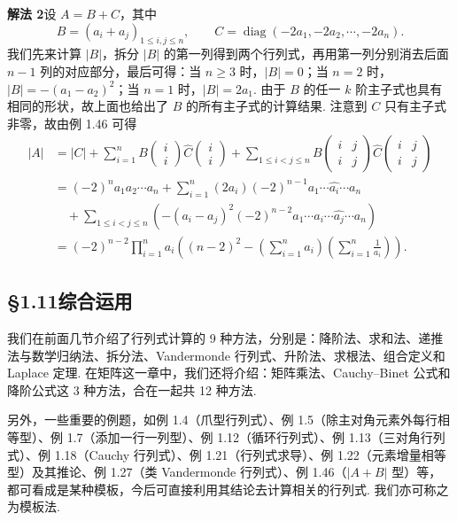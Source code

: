 \documentclass[UTF8,12pt,a4paper,fontset=fandol]{ctexart}
\begin{document}
\noindent\textbf{解法 2}\quad 设 $A=B+C$，其中
\[
B=(a_i+a_j)_{1\le i,j\le n},\qquad C=\operatorname{diag}(-2a_1,-2a_2,\cdots,-2a_n).
\]
我们先来计算 $|B|$，拆分 $|B|$ 的第一列得到两个行列式，再用第一列分别消去后面 $n-1$ 列的对应部分，最后可得：当 $n\ge3$ 时，$|B|=0$；当 $n=2$ 时，$|B|=-(a_1-a_2)^2$；当 $n=1$ 时，$|B|=2a_1$. 由于 $B$ 的任一 $k$ 阶主子式也具有相同的形状，故上面也给出了 $B$ 的所有主子式的计算结果. 注意到 $C$ 只有主子式非零，故由例 1.46 可得
\[
\begin{aligned}
|A|
&=|C|+\sum_{i=1}^n B\begin{pmatrix}i\\ i\end{pmatrix}\widehat{C}\begin{pmatrix}i\\ i\end{pmatrix}
+\sum_{1\le i<j\le n}B\begin{pmatrix}i&j\\ i&j\end{pmatrix}\widehat{C}\begin{pmatrix}i&j\\ i&j\end{pmatrix}\\
&=(-2)^na_1a_2\cdots a_n+\sum_{i=1}^n(2a_i)(-2)^{n-1}a_1\cdots\widehat{a_i}\cdots a_n\\
&\quad+\sum_{1\le i<j\le n}\left(-(a_i-a_j)^2(-2)^{n-2}a_1\cdots\widehat{a_i}\cdots\widehat{a_j}\cdots a_n\right)\\
&=(-2)^{n-2}\prod_{i=1}^n a_i
\left((n-2)^2-\left(\sum_{i=1}^n a_i\right)\left(\sum_{i=1}^n\frac1{a_i}\right)\right).
\end{aligned}
\]

\subsection*{§1.11\quad 综合运用}

我们在前面几节介绍了行列式计算的 9 种方法，分别是：降阶法、求和法、递推法与数学归纳法、拆分法、Vandermonde 行列式、升阶法、求根法、组合定义和 Laplace 定理. 在矩阵这一章中，我们还将介绍：矩阵乘法、Cauchy--Binet 公式和降阶公式这 3 种方法，合在一起共 12 种方法.

另外，一些重要的例题，如例 1.4（爪型行列式）、例 1.5（除主对角元素外每行相等型）、例 1.7（添加一行一列型）、例 1.12（循环行列式）、例 1.13（三对角行列式）、例 1.18（Cauchy 行列式）、例 1.21（行列式求导）、例 1.22（元素增量相等型）及其推论、例 1.27（类 Vandermonde 行列式）、例 1.46（$|A+B|$ 型）等，都可看成是某种模板，今后可直接利用其结论去计算相关的行列式. 我们亦可称之为模板法.
\end{document}
